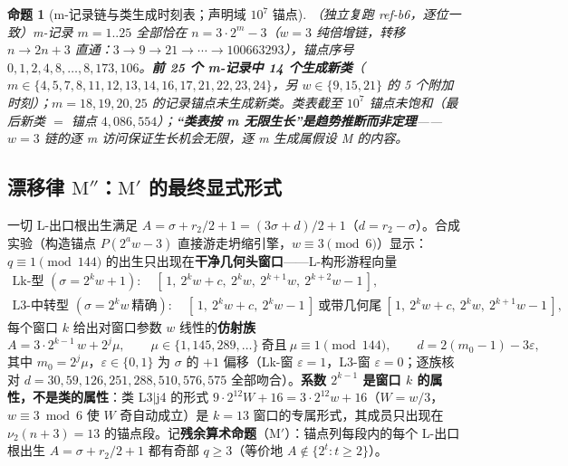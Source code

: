\documentclass[11pt]{ctexart}
\newtheorem{proposition}[theorem]{命题}
\theoremstyle{definition}
\newcommand{\vtwo}[1]{\nu_2(#1)}
\begin{document}
\begin{proposition}[m-记录链与类生成时刻表；声明域 $10^7$ 锚点]\label{prop:mrecords}
（独立复跑 ref-b6，逐位一致）m-记录 $m=1..25$ 全部恰在 $n=3\cdot2^{m}-3$（$w=3$ 纯倍增链，转移 $n\to2n{+}3$ 直通：$3\to9\to21\to\cdots\to100663293$），锚点序号 $0,1,2,4,8,\dots,8{,}173{,}106$。\textbf{前 25 个 m-记录中 14 个生成新类}（$m\in\{4,5,7,8,11,12,13,14,16,17,21,22,23,24\}$，另 $w\in\{9,15,21\}$ 的 5 个附加时刻）；$m=18,19,20,25$ 的记录锚点未生成新类。类表截至 $10^7$ 锚点未饱和（最后新类 $=$ 锚点 $4{,}086{,}554$）；\textbf{``类表按 m 无限生长''是趋势推断而非定理}——$w=3$ 链的逐 m 访问保证生长\emph{机会}无限，逐 m 生成属假设 M 的内容。
\end{proposition}

\subsection{漂移律 \texorpdfstring{$\mathrm{M''}$}{M''}：\texorpdfstring{$\mathrm{M'}$}{M'} 的最终显式形式}

一切 L-出口根出生满足 $A=\sigma+r_2/2+1=(3\sigma+d)/2+1$（$d=r_2-\sigma$）。合成实验（构造锚点 $P(2^{a}w-3)$ 直接游走坍缩引擎，$w\equiv3\pmod6$）显示：$q\equiv1\pmod{144}$ 的出生只出现在\textbf{干净几何头窗口}——L-构形游程向量
\begin{gather*}
\text{Lk-型 }(\sigma=2^{k}w+1):\quad [\,1,\ 2^{k}w+c,\ 2^{k}w,\ 2^{k+1}w,\ 2^{k+2}w-1\,],\\
\text{L3-中转型 }(\sigma=2^{k}w\ \text{精确}):\quad [\,1,\ 2^{k}w+c,\ 2^{k}w-1\,]\ \text{或带几何尾}\ [\,1,\ 2^{k}w+c,\ 2^{k}w,\ 2^{k+1}w-1\,],
\end{gather*}
每个窗口 $k$ 给出对窗口参数 $w$ 线性的\textbf{仿射族}
\begin{equation}\label{eq:family}
A=3\cdot2^{k-1}\,w+2^{j}\mu,\qquad \mu\in\{1,145,289,\dots\}\ \text{奇且}\ \mu\equiv1\!\pmod{144},\qquad d=2(m_0{-}1)-3\varepsilon,
\end{equation}
其中 $m_0=2^{j}\mu$，$\varepsilon\in\{0,1\}$ 为 $\sigma$ 的 $+1$ 偏移（Lk-窗 $\varepsilon=1$，L3-窗 $\varepsilon=0$；逐族核对 $d=30,59,126,251,288,510,576,575$ 全部吻合）。\textbf{系数 $2^{k-1}$ 是窗口 $k$ 的属性，不是类的属性}：类 L3$|$j4 的形式 $9\cdot2^{12}W+16=3\cdot2^{12}w+16$（$W=w/3$，$w\equiv3\bmod6$ 使 $W$ 奇自动成立）是 $k=13$ 窗口的专属形式，其成员只出现在 $\vtwo{n+3}=13$ 的锚点段。记\textbf{残余算术命题}（$\mathrm{M'}$）：锚点列每段内的每个 L-出口根出生 $A=\sigma+r_2/2+1$ 都有奇部 $q\ge3$（等价地 $A\notin\{2^{t}:t\ge2\}$）。
\end{document}
